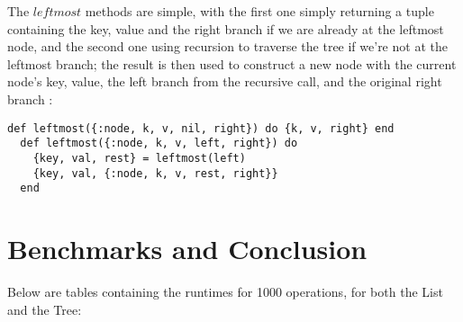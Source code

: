 \documentclass[a4paper,11pt]{article}
\begin{document}
The $leftmost$ methods are simple, with the first one simply returning a tuple containing the key, value and the right branch if we are already at the leftmost node, and the second one using recursion to traverse the tree if we're not at the leftmost branch; the result is then used to construct a new node with the current node's key, value, the left branch from the recursive call, and the original right branch :

\begin{verbatim}
def leftmost({:node, k, v, nil, right}) do {k, v, right} end
  def leftmost({:node, k, v, left, right}) do
    {key, val, rest} = leftmost(left)
    {key, val, {:node, k, v, rest, right}}
  end
\end{verbatim} 

\section*{Benchmarks and Conclusion}
Below are tables containing the runtimes for 1000 operations, for both the List and the Tree:
\end{document}
